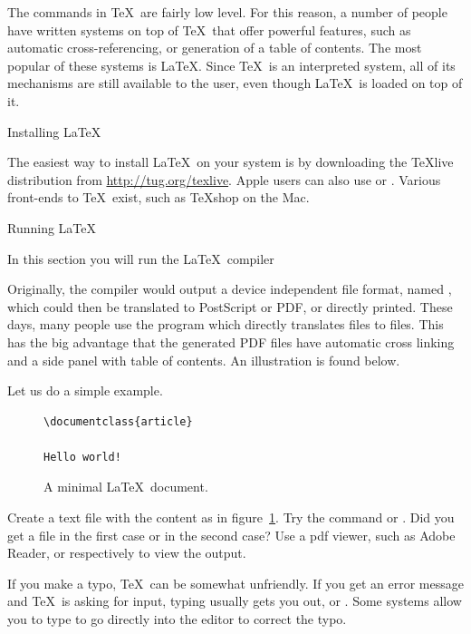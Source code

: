 The commands in \TeX\ are fairly low level. For this reason, a number
of people have written systems on top of \TeX\ that offer powerful
features, such as automatic cross-referencing, or generation of a
table of contents. The most popular of these systems is \LaTeX. Since
\TeX\ is an interpreted system, all of its mechanisms are still
available to the user, even though \LaTeX\ is loaded on top of it.


 {Installing \LaTeX}

The easiest way to install \LaTeX\ on your system is by downloading
the \TeX{}live distribution from \url{http://tug.org/texlive}. Apple
users can also use  or . Various front-ends to
\TeX\ exist, such as \TeX{}shop on the Mac.

 {Running \LaTeX}

\begin{purpose}
In this section you will run the \LaTeX\ compiler  
\end{purpose}

Originally, the  compiler would output a device independent
file format, named , which could then be translated to
PostScript or PDF, or directly printed. These days, many people use
the  program which directly translates  files to
 files. This has the big advantage that the generated PDF
files have automatic cross linking and a side panel with table of
contents. An illustration is found below.

Let us do a simple example.
\begin{figure}[ht]
\begin{verbatim}
\documentclass{article}

Hello world!

\end{verbatim}
  \caption{A minimal \LaTeX\ document.}
  \label{fig:minimaldoc}
\end{figure}

\begin{exercise}
Create a text file  with the content as in
figure~\ref{fig:minimaldoc}. Try the command  or
. Did you get a file  in the first
case or  in the second case? Use a pdf viewer, such
as Adobe Reader, or
 respectively to view the output.
\end{exercise}

\begin{caution}
{If you make a typo, \TeX\ can be somewhat unfriendly. If you get an
error message and \TeX\ is asking for input, typing 
usually gets you out, or . Some systems allow you to type
 to go directly into the editor to correct the typo.}
\end{caution}

